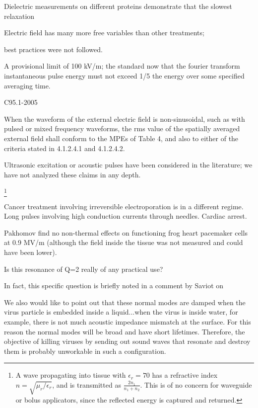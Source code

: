 \documentclass[paper.tex]{subfiles}
\begin{document}
\begin{multicols}{1}
Dielectric measurements on different proteins demonstrate that the slowest relaxation 








Electric field has many more free variables than other treatments; 



best practices were not followed.





A provisional limit of 100 kV/m; the standard now that the fourier transform instantaneous pulse energy must not exceed 1/5 the energy over some specified averaging time.

C95.1-2005


When the waveform of the external electric field is non-sinusoidal, such as with pulsed or mixed frequency
waveforms, the rms value of the spatially averaged external field shall conform to the MPEs of Table 4, and
also to either of the criteria stated in 4.1.2.4.1 and 4.1.2.4.2.

 
Ultrasonic excitation or acoustic pulses have been considered in the literature; we have not analyzed these claims in any depth.







\footnote{A wave propagating into tissue with $\epsilon_r=70$ has a refractive index $n=\sqrt{\mu_r/\epsilon_r}$, and is transmitted as $\frac{2 n_1}{n_1 + n_2}$. This is of no concern for waveguide or bolus applicators, since the reflected energy is captured and returned.}






Cancer treatment involving irreversible electroporation is in a different regime. Long pulses involving high conduction currents through needles. Cardiac arrest.



Pakhomov \cite{Comparative} find no non-thermal effects on functioning frog heart pacemaker cells at 0.9 MV/m (although the field inside the tissue was not measured and could have been lower). 


Is this resonance of Q=2 really of any practical use?


In fact, this specific question is briefly noted in a comment by Saviot \cite{Comment2004} on 


\begin{fquote}
	We also would like to point out that these normal modes are damped when the virus particle is embedded inside a liquid...when the virus is inside water, for example, there is not much acoustic impedance mismatch at the surface. For this reason the normal modes will be broad and have short lifetimes. Therefore, the objective of killing viruses by sending out sound waves that resonate and destroy them is probably unworkable in such a configuration.	
\end{fquote}





\end{multicols}
\end{document}
